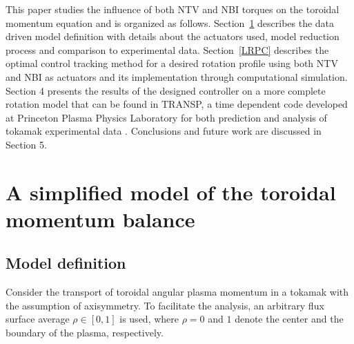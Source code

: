 \documentclass[12pt]{iopart}
\begin{document}
This paper studies the influence of both NTV and NBI torques on the toroidal momentum equation and is organized as follows.
 Section~\ref{MHW} describes the data driven model definition with details about the actuators used, model reduction process and comparison to experimental data. Section~\ref{LRPC} describes the optimal control tracking method for a desired rotation profile using both NTV and NBI as actuators and its implementation through computational simulation. Section 4 presents the results of the designed controller on a more complete rotation model that can be found in TRANSP, a time dependent code developed at Princeton Plasma Physics Laboratory for both prediction and analysis of tokamak experimental data \cite{Budny94}. Conclusions and future work are discussed in Section 5.


 \section{A simplified model of  the toroidal momentum balance }
 \label{MHW}
 
\subsection{Model definition}
Consider the transport of toroidal angular plasma momentum in a tokamak with the assumption of axisymmetry.  To facilitate the analysis, an arbitrary flux surface average $\rho \in [0,1]$ is used, where $\rho = 0$ and $1$ denote the center and the boundary of the plasma, respectively.  
\end{document}
